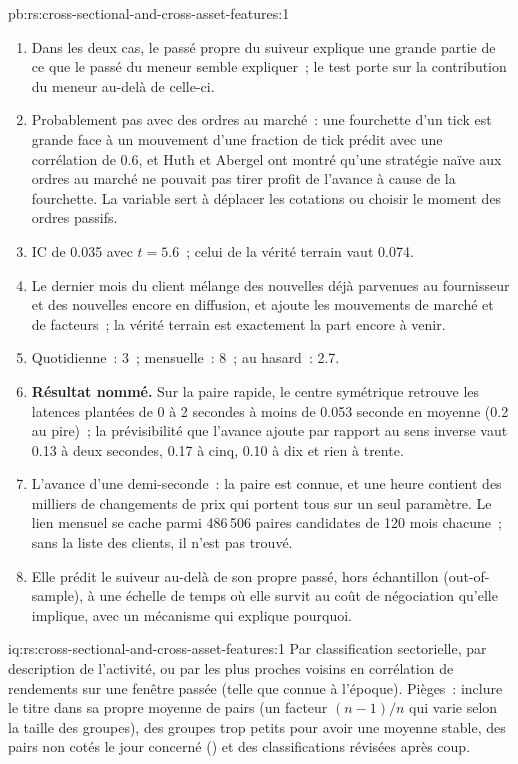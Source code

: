 \begin{solution}{pb:rs:cross-sectional-and-cross-asset-features:1}
\begin{enumerate}
seconde, la plupart des intervalles ne contiennent aucun changement de prix.
\item Dans les deux cas, le passé propre du suiveur explique une grande partie de ce que le passé du meneur semble expliquer~; le test porte sur la contribution du meneur au-delà de celle-ci.
\item Probablement pas avec des ordres au marché~: une fourchette d'un tick est grande face à un mouvement d'une fraction de tick prédit avec une corrélation de 0.6,
et Huth et Abergel ont montré qu'une stratégie naïve aux ordres au marché ne pouvait pas tirer profit de l'avance à cause de la fourchette. La variable sert à
déplacer les cotations ou choisir le moment des ordres passifs.
\item IC de 0.035 avec $t = 5.6$~; celui de la vérité terrain vaut 0.074.
\item Le dernier mois du client mélange des nouvelles déjà parvenues au fournisseur et des nouvelles encore en diffusion, et ajoute les
mouvements de marché et de facteurs~; la vérité terrain est exactement la part encore à venir.
\item Quotidienne~: 3~; mensuelle~: 8~; au hasard~: 2.7.
\item \textbf{Résultat nommé.} Sur la paire rapide, le centre symétrique retrouve les latences plantées de 0 à 2 secondes à moins de 0.053 seconde en
moyenne (0.2 au pire)~; la prévisibilité que l'avance ajoute par rapport au sens inverse vaut 0.13 à deux secondes, 0.17 à cinq, 0.10 à dix
et rien à trente.
\item L'avance d'une demi-seconde~: la paire est connue, et une heure contient des milliers de changements de prix qui portent tous sur un seul paramètre. Le lien mensuel
se cache parmi 486\,506 paires candidates de 120 mois chacune~; sans la liste des clients, il n'est pas trouvé.
\item Elle prédit le suiveur au-delà de son propre passé, hors échantillon (out-of-sample), à une échelle de temps où elle survit au coût de négociation qu'elle implique,
avec un mécanisme qui explique pourquoi.
\end{enumerate}
\end{solution}

\begin{solution}{iq:rs:cross-sectional-and-cross-asset-features:1}
Par classification sectorielle, par description de l'activité, ou par les plus proches voisins en corrélation de rendements sur une fenêtre passée (telle que connue à
l'époque). Pièges~: inclure le titre dans sa propre moyenne de pairs (un facteur $(n-1)/n$ qui varie selon la taille des groupes), des groupes trop petits pour
avoir une moyenne stable, des pairs non cotés le jour concerné () et des classifications révisées après coup.
\end{solution}

